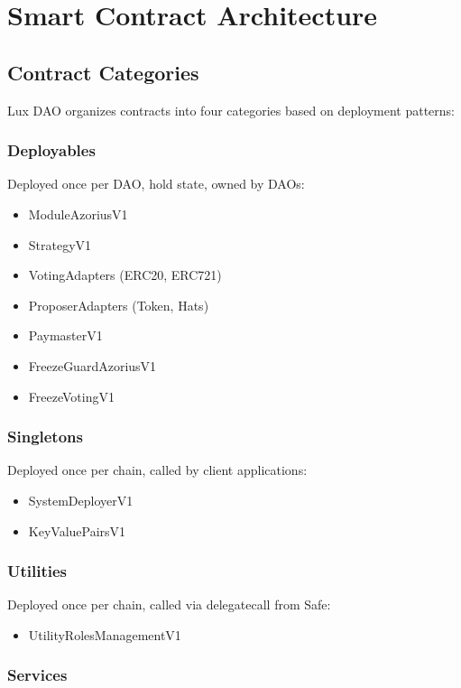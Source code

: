 \section{Smart Contract Architecture}


\subsection{Contract Categories}

Lux DAO organizes contracts into four categories based on deployment patterns:

\subsubsection{Deployables}

Deployed once per DAO, hold state, owned by DAOs:
\begin{itemize}
    \item ModuleAzoriusV1
    \item StrategyV1
    \item VotingAdapters (ERC20, ERC721)
    \item ProposerAdapters (Token, Hats)
    \item PaymasterV1
    \item FreezeGuardAzoriusV1
    \item FreezeVotingV1
\end{itemize}

\subsubsection{Singletons}

Deployed once per chain, called by client applications:
\begin{itemize}
    \item SystemDeployerV1
    \item KeyValuePairsV1
\end{itemize}

\subsubsection{Utilities}

Deployed once per chain, called via delegatecall from Safe:
\begin{itemize}
    \item UtilityRolesManagementV1
\end{itemize}

\subsubsection{Services}

